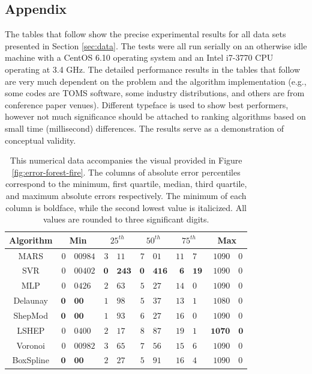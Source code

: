 \documentclass[smallextended,final]{svjour3}  %
\begin{document}
\begin{appendix}
\section*{Appendix}
\label{sec:appendix}

The tables that follow show the precise experimental results for all
data sets presented in Section \ref{sec:data}. The tests were all run
serially on an otherwise idle machine with a CentOS 6.10 operating
system and an Intel i7-3770 CPU operating at 3.4 GHz. The detailed
performance results in the tables that follow are very much dependent
on the problem and the algorithm implementation (e.g., some codes are
TOMS software, some industry distributions, and others are from
conference paper venues). Different typeface is used to show best
performers, however not much significance should be attached to
ranking algorithms based on small time (millisecond) differences. The
results serve as a demonstration of conceptual validity.

\vspace*{\fill}

\begin{table}[H]
  \centering
  \begin{tabular}{c|r@{.}l|r@{.}l|r@{.}l|r@{.}l|r@{.}l}
    \hline
    Algorithm & \multicolumn{2}{c|}{Min} & \multicolumn{2}{c|}{$25^{th}$} & \multicolumn{2}{c|}{$50^{th}$} & \multicolumn{2}{c|}{$75^{th}$} & \multicolumn{2}{c}{Max}\\
    \hline
    MARS & $0$&$00984$ & $3$&$11$ & $7$&$01$ & $\mathit{11}$&$\mathit{7}$ & $1090$&$0$\\
    SVR & $\mathit{0}$&$\mathit{00402}$ & $\mathbf{0}$&$\mathbf{243}$ & $\mathbf{0}$&$\mathbf{416}$ & $\mathbf{6}$&$\mathbf{19}$ & $1090$&$0$\\
    MLP & $0$&$0426$ & $2$&$63$ & $\mathit{5}$&$\mathit{27}$ & $14$&$0$ & $1090$&$0$\\
    Delaunay & $\mathbf{0}$&$\mathbf{00}$ & $1$&$98$ & $5$&$37$ & $13$&$1$ & $\mathit{1080}$&$\mathit{0}$\\
    ShepMod & $\mathbf{0}$&$\mathbf{00}$ & $\mathit{1}$&$\mathit{93}$ & $6$&$27$ & $16$&$0$ & $1090$&$0$\\
    LSHEP & $0$&$0400$ & $2$&$17$ & $8$&$87$ & $19$&$1$ & $\mathbf{1070}$&$\mathbf{0}$\\
    Voronoi & $0$&$00982$ & $3$&$65$ & $7$&$56$ & $15$&$6$ & $1090$&$0$\\
    BoxSpline & $\mathbf{0}$&$\mathbf{00}$ & $2$&$27$ & $5$&$91$ & $16$&$4$ & $1090$&$0$\\
    \hline
  \end{tabular}
  \caption{This numerical data accompanies the visual provided in
    Figure \ref{fig:error-forest-fire}. The columns of absolute error
    percentiles correspond to the minimum, first quartile, median,
    third quartile, and maximum absolute errors respectively. The
    minimum of each column is boldface, while the second lowest value
    is italicized. All values are rounded to three significant
    digits.}
  \label{table:error-forest-fire}
\end{table}


\end{appendix}
\end{document}
